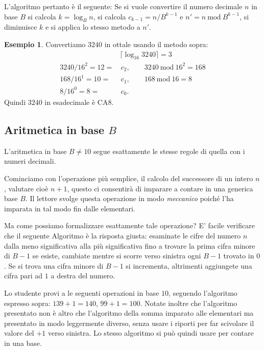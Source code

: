 \documentclass[a4paper]{book}
\theoremstyle{definition}
\newtheorem{ex}{Esempio}
\newcommand{\nota}[1]{\marginpar[{\raggedleft\small\sffamily #1\\}]{%
 								 {\raggedright\small\sffamily #1\\}}}
\newcommand{\Mod}[1]{\ \text{mod}\ #1}
\begin{document}
L'algoritmo pertanto è il seguente: Se si vuole convertire il numero decimale $n$ in base $B$ si calcola $k = \log_B n$, si calcola $c_{k-1} = n / B^{k-1}$ e $n' = n \Mod{B^{k-1}}$, si diminuisce $k$ e si applica lo stesso metodo a $n'$. 

\begin{ex}
Convertiamo $3240$ in ottale usando il metodo sopra:
\begin{align*}
  &\lceil \log_{16} 3240 \rceil = 3\\
  3240 / 16^2 = 12 = &\, c_2, \qquad 3240 \Mod{16^2} = 168\\
  168 / 16^1 = 10 = &\, c_1,  \qquad 168 \Mod{16} = 8\\
  8 / 16^0 = 8 = &\, c_0.  
\end{align*}
Quindi $3240$ in esadecimale è $\mathrm{CA}8$.
\end{ex}

\subsection{Aritmetica in base \protect$B$}

L'aritmetica in base $B\neq 10$ segue esattamente le stesse regole di quella con i numeri decimali. 

Cominciamo con l'operazione più semplice, il calcolo del successore di un intero $n$, valutare cioè $n+1$, questo ci consentirà di imparare a contare in una generica base $B$. Il lettore svolge questa operazione in modo \emph{meccanico} poiché l'ha imparata in tal modo fin dalle elementari. 

Ma come possiamo formalizzare esattamente tale operazione?\nota{Contare in Base
$B$} E' facile verificare che il seguente Algoritmo è la risposta giusta:
esaminate le cifre del numero $n$ dalla meno significativa alla più
significativa fino a trovare la prima cifra minore di $B-1$ se esiste, cambiate
mentre si scorre verso sinistra ogni $B-1$ trovato in $0$. Se si trova una
cifra minore di $B-1$ si incrementa, altrimenti aggiungete una cifra pari ad
$1$ a destra del numero.

Lo studente provi a le seguenti operazioni in base $10$, seguendo l'algoritmo
espresso sopra: $139+1 = 140$, $99+1 = 100$. Notate inoltre che l'algoritmo presentato non è altro che l'algoritmo della somma imparato alle elementari ma presentato in modo leggermente diverso, senza usare i riporti per far scivolare
il valore del $+1$ verso sinistra. Lo stesso algoritmo si può quindi usare per contare in una base.
\end{document}
